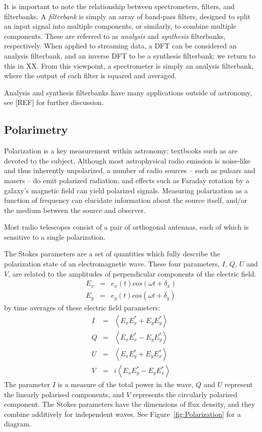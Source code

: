 \documentclass{ws-rv961x669}
\begin{document}
It is important to note the relationship between spectrometers, filters, and filterbanks. A \emph{filterbank} is simply an array of band-pass filters, designed to split an input signal into multiple components, or similarly, to combine multiple components. These are referred to as \emph{analysis} and \emph{synthesis} filterbanks, respectively. When applied to streaming data, a DFT can be considered an analysis filterbank, and an inverse DFT to be a synthesis filterbank; we return to this in XX. From this viewpoint, a spectrometer is simply an analysis filterbank, where the output of each filter is squared and averaged.

Analysis and synthesis filterbanks have many applications outside of astronomy, see [REF] for further discussion.

\subsection{Polarimetry}

Polarization is a key measurement within astronomy; textbooks such as \citet{BookTinbergenPolarim} are devoted to the subject.  Although most astrophysical radio emission is noise-like and thus inherently unpolarized, a number of radio sources -- such as pulsars and masers -- do emit polarized radiation, and effects such as Faraday rotation by a galaxy's magnetic field can yield polarized signals. Measuring polarization as a function of frequency can elucidate information about the source itself, and/or the medium between the source and observer. 

Most radio telescopes consist of a pair of orthogonal antennas, each of which is sensitive to a single polarization. 

The Stokes parameters are a set of quantities which fully describe the polarization state of an electromagnetic wave. These four parameters, $I$, $Q$, $U$ and $V$, are related to the amplitudes of perpendicular components of the electric field.
\begin{eqnarray}
E_{x} & = & e_{x}(t)cos(\omega t+\delta_{x})\\
E_{y} & = & e_{y}(t)cos(\omega t+\delta_{y})
\end{eqnarray}
by time averages of these electric field parameters:
\begin{eqnarray}
I & = & \left\langle E_{x}E_{x}^{*}+E_{y}E_{y}^{*}\right\rangle \\
Q & = & \left\langle E_{x}E_{x}^{*}-E_{y}E_{y}^{*}\right\rangle \\
U & = & \left\langle E_{x}E_{y}^{*}+E_{y}E_{x}^{*}\right\rangle \\
V & = & i\left\langle E_{x}E_{y}^{*}-E_{y}E_{x}^{*}\right\rangle 
\end{eqnarray}
The parameter $I$ is a measure of the total power in the wave, $Q$
and $U$ represent the linearly polarised components, and $V$ represents
the circularly polarised component. The Stokes parameters have the
dimensions of flux density, and they combine additively for independent
waves. See Figure~\ref{fig:Polarization} for a diagram.
\end{document}
